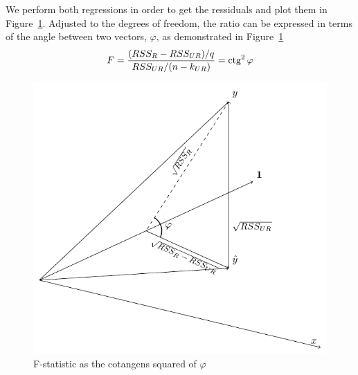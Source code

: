 We perform both regressions in order to get the ressiduals and plot them
in Figure~\ref{fig:ftest}.
Adjusted to the degrees of freedom, the ratio can be expressed in terms of the
angle between two vectors, $\varphi$, as demonstrated in Figure~\ref{fig:ftest}
\[
F = \frac{(RSS_{R} - RSS_{UR})/q}{RSS_{UR}/(n-k_{UR})} = \operatorname{ctg}^2 \varphi
\]

\begin{figure}
\centering
\includegraphics[width=0.55\linewidth]{figures/04_ftest.pdf}
\caption{F-statistic as the cotangens squared of $\varphi$}
\label{fig:ftest}
\end{figure}
